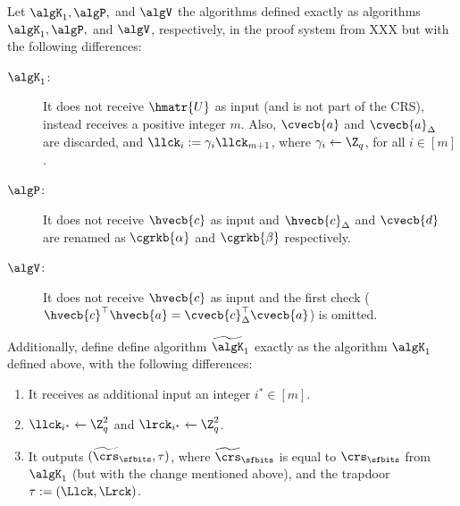 \begin{definition}
Let $\algK_1,\algP,$ and $\algV$ the algorithms defined exactly as algorithms $\algK_1,\algP,$ and $\algV$, respectively, in the proof system from XXX but with the following differences:
\begin{description}
\item[$\algK_1$:] It does not receive $\hmatr{U}$ as input (and is not part of the CRS), instead receives a positive integer $m$. Also, $\cvecb{a}$ and $\cvecb{a}_\Delta$ are discarded, and $\llck_i := \gamma_i\llck_{m+1}$, where $\gamma_i\gets\Z_q$, for all $i\in[m]$.
\item[$\algP$:] It does not receive $\hvecb{c}$ as input and $\hvecb{c}_\Delta$ and $\cvecb{d}$ are renamed as $\cgrkb{\alpha}$ and $\cgrkb{\beta}$ respectively.
\item[$\algV$:] It does not receive $\hvecb{c}$ as input and the first check ($\hvecb{c}^\top\hvecb{a}=\cvecb{c}_\Delta^\top\cvecb{a}$) is omitted.
\end{description}

Additionally, define define algorithm $\widetilde{\algK}_1$ exactly as the algorithm $\algK_1$ defined above, with the following differences:
\begin{enumerate}[label=(\alph*)]
\item It receives as additional input an integer $i^*\in[m]$.
\item $\llck_{i^*}\gets\Z_q^2$ and $\lrck_{i^*}\gets\Z_q^2$.
\item It outputs $(\widetilde{\crs}_\sfbits,\tau)$, where $\widetilde{\crs}_\sfbits$ is equal to $\crs_\sfbits$ from $\algK_1$ (but with the change mentioned above), and the trapdoor $\tau:=(\Llck,\Lrck)$.
\end{enumerate}
\end{definition}

